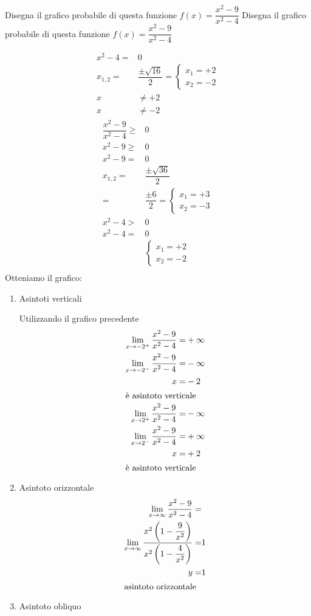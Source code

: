 \begin{exercise}
	Disegna il grafico probabile di questa funzione $f(x)= \dfrac{x^2-9}{x^2-4}$
	\tcblower
	Disegna il grafico probabile di questa funzione $f(x)= \dfrac{x^2-9}{x^2-4}$
	\begin{itemize}
	\begin{align*}
x^2-4=&0\\
x_{1,2}=&\dfrac{\pm\sqrt{16}}{2}
=\begin{cases}
x_1=+2\\
x_2=-2
\end{cases}\\
x&\neq+2\\
x&\neq-2
\end{align*}
		\begin{align*}
	\dfrac{x^2-9}{x^2-4}\geq&0\\
	x^2-9\geq&0\\
	x^2-9=&0\\
	x_{1,2}=&\dfrac{\pm\sqrt{36}}{2}\\
	=&\dfrac{\pm 6}{2}
	=\begin{cases}
	x_1=+3\\
	x_2=-3
	\end{cases}\\
	x^2-4>&0\\
	x^2-4=&0\\
	&\begin{cases}
	x_1=+2\\
	x_2=-2
	\end{cases}\\
	\end{align*}
	Otteniamo il grafico:
	\begin{center}
		
	\end{center}
	\begin{enumerate}
		\item Asintoti verticali
		
		Utilizzando il grafico precedente
		\begin{align*}
		\lim_{x\to -2^+}\dfrac{x^2-9}{x^2-4}=&+\infty\\
		\lim_{x\to -2^-}\dfrac{x^2-9}{x^2-4}=&-\infty\\
		x=&-2\\
		\intertext{è asintoto verticale}
		\lim_{x\to 2^+} \dfrac{x^2-9}{x^2-4}=&-\infty\\
		\lim_{x\to 2^-} \dfrac{x^2-9}{x^2-4}=&+\infty\\
		x=&+2\\
		\intertext{è asintoto verticale}
		\end{align*}
		\item Asintoto orizzontale 
			\begin{align*}
		\lim_{x\to \infty}\dfrac{x^2-9}{x^2-4}=&\\
		\lim_{x\to \infty}\dfrac{x^2\left(1-\dfrac{9}{x^2}\right)}{x^2\left(1-\dfrac{4}{x^2}\right)}=&1\\
		y=&1\\
		\intertext{asintoto orizzontale}
		\end{align*}
		\item Asintoto obliquo
		

\end{enumerate}
\end{itemize}
\end{exercise}
